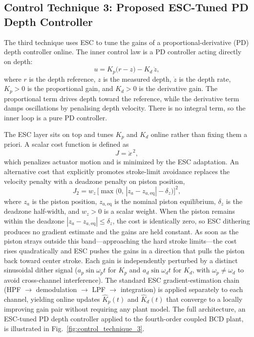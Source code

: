 ﻿\documentclass[subscriptcorrection,upint,varvw,barcolor=Goldenrod3,mathalfa=cal=euler,balance,hyphenate,french,pdf-a]{asmejour}
\begin{document}
\subsection{Control Technique 3: Proposed ESC-Tuned PD Depth Controller}
The third technique uses ESC to tune the gains of a proportional-derivative (PD) depth controller online. The inner control law is a PD controller acting directly on depth:
\begin{equation}
    u = K_p\bigl(r - z\bigr) - K_d\,\dot{z},
    \label{eqn:pd_law}
\end{equation}
where $r$ is the depth reference, $z$ is the measured depth, $\dot{z}$ is the depth rate, $K_p > 0$ is the proportional gain, and $K_d > 0$ is the derivative gain. The proportional term drives depth toward the reference, while the derivative term damps oscillations by penalising depth velocity. There is no integral term, so the inner loop is a pure PD controller.

The ESC layer sits on top and tunes $K_p$ and $K_d$ online rather than fixing them a priori. A scalar cost function is defined as
\begin{equation}
    J = \dot{x}^{\,2},
    \label{eqn:cost_esc3}
\end{equation}
which penalizes actuator motion and is minimized by the ESC adaptation.  An alternative cost that explicitly promotes stroke-limit avoidance replaces the velocity penalty with a deadzone penalty on piston position,
\begin{equation}
    J_2 = w_z\,\bigl[\max\!\bigl(0,\,|z_a - z_{a,\mathrm{eq}}| - \delta_z\bigr)\bigr]^{2},
    \label{eqn:cost_esc3_deadzone}
\end{equation}
where $z_a$ is the piston position, $z_{a,\mathrm{eq}}$ is the nominal piston equilibrium, $\delta_z$ is the deadzone half-width, and $w_z > 0$ is a scalar weight.  When the piston remains within the deadzone $|z_a - z_{a,\mathrm{eq}}| \leq \delta_z$, the cost is identically zero, so ESC dithering produces no gradient estimate and the gains are held constant.  As soon as the piston strays outside this band---approaching the hard stroke limits---the cost rises quadratically and ESC pushes the gains in a direction that pulls the piston back toward center stroke.  Each gain is independently perturbed by a distinct sinusoidal dither signal ($a_p\sin\omega_p t$ for $K_p$ and $a_d\sin\omega_d t$ for $K_d$, with $\omega_p \neq \omega_d$ to avoid cross-channel interference). The standard ESC gradient-estimation chain (HPF $\to$ demodulation $\to$ LPF $\to$ integration) is applied separately to each channel, yielding online updates $\hat{K}_p(t)$ and $\hat{K}_d(t)$ that converge to a locally improving gain pair without requiring any plant model. The full architecture, an ESC-tuned PD depth controller applied to the fourth-order coupled BCD plant, is illustrated in Fig.~\ref{fig:control_technique_3}.
\end{document}
